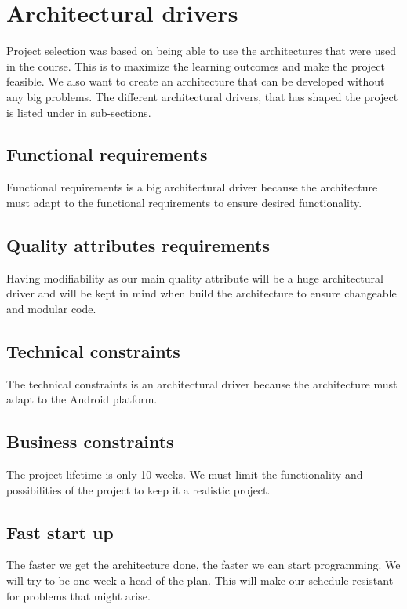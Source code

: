 \pagebreak
\section{Architectural drivers}
Project selection was based on being able to use the architectures that were used in the course. This is to maximize the learning outcomes and make the project feasible. We also want to create an architecture that can be developed without any big problems. The different architectural drivers, that has shaped the project is listed under in sub-sections.

\subsection{Functional requirements}
Functional requirements is a big architectural driver because the architecture must adapt to the functional requirements to ensure desired functionality.
 
\subsection{Quality attributes requirements}
Having modifiability as our main quality attribute will be a huge architectural driver and will be kept in mind when build the architecture to ensure changeable and modular code.

\subsection{Technical constraints}
The technical constraints is an architectural driver because the architecture must adapt to the Android platform.

\subsection{Business constraints}
The project lifetime is only 10 weeks. We must limit the functionality and possibilities of the project to keep it a realistic project.

\subsection{Fast start up}
The faster we get the architecture done, the faster we can start programming. We will try to be one week a head of the plan. This will make our schedule resistant for problems that might arise.



